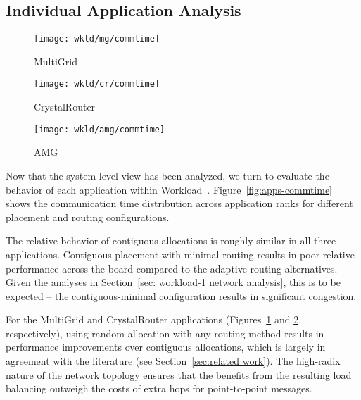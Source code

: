 \subsection{Individual Application Analysis}
\label{sec: workload-1 app analysis}

\begin{figure*}[t!]
    \centering
    \begin{subfigure}[t]{0.32\textwidth}
        \centering
        \texttt{[image: wkld/mg/commtime]}
        \caption{MultiGrid}
        \label{fig:mg-commtime}
    \end{subfigure}%
    \hspace{1em}%
    \begin{subfigure}[t]{0.32\textwidth}
        \centering
        \texttt{[image: wkld/cr/commtime]}
        \caption{CrystalRouter}
        \label{fig:cr-commtime}
    \end{subfigure}%
    \hspace{1em}%
    \begin{subfigure}[t]{0.32\textwidth}
        \centering
        \texttt{[image: wkld/amg/commtime]}
        \caption{AMG}
        \label{fig:amg-commtime}
    \end{subfigure}%
    \caption{Communication time distribution across application ranks in Workload~.}
   \label{fig:apps-commtime}
\end{figure*}

Now that the system-level view has been analyzed, we turn to evaluate the
behavior of each application within Workload~.
Figure~\ref{fig:apps-commtime} shows the communication time distribution across
application ranks for different placement and routing configurations.

The relative behavior of contiguous allocations is roughly similar in all three
applications. Contiguous placement with minimal routing results in poor relative
performance across the board compared to the adaptive routing alternatives.
Given the analyses in Section~\ref{sec: workload-1 network analysis}, this is to
be expected -- the contiguous-minimal configuration results in significant
congestion.

For the MultiGrid and CrystalRouter applications (Figures~\ref{fig:mg-commtime} and
\ref{fig:cr-commtime}, respectively), using random allocation with any routing
method results in performance improvements over contiguous allocations, which is
largely in agreement with the literature (see Section~\ref{sec:related work}).
The high-radix nature of the
network topology ensures that the benefits from the resulting load balancing
outweigh the costs of extra hops for point-to-point messages.

